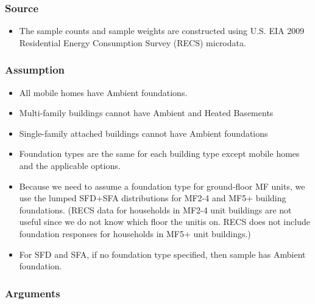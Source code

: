 \subsubsection{Source}\label{source-53}

\begin{itemize}
 
\item
  The sample counts and sample weights are constructed using U.S. EIA
  2009 Residential Energy Consumption Survey (RECS) microdata.
\end{itemize}

\subsubsection{Assumption}\label{assumption-28}

\begin{itemize}
 
\item
  All mobile homes have Ambient foundations.
\item
  Multi-family buildings cannot have Ambient and Heated Basements
\item
  Single-family attached buildings cannot have Ambient foundations
\item
  Foundation types are the same for each building type except mobile
  homes and the applicable options.
\item
  Because we need to assume a foundation type for ground-floor MF units,
  we use the lumped SFD+SFA distributions for MF2-4 and MF5+ building
  foundations. (RECS data for households in MF2-4 unit buildings are not
  useful since we do not know which floor the unitis on. RECS does not
  include foundation responses for households in MF5+ unit buildings.)
\item
  For SFD and SFA, if no foundation type specified, then sample has
  Ambient foundation.
\end{itemize}

\subsubsection{Arguments}\label{arguments-35}

